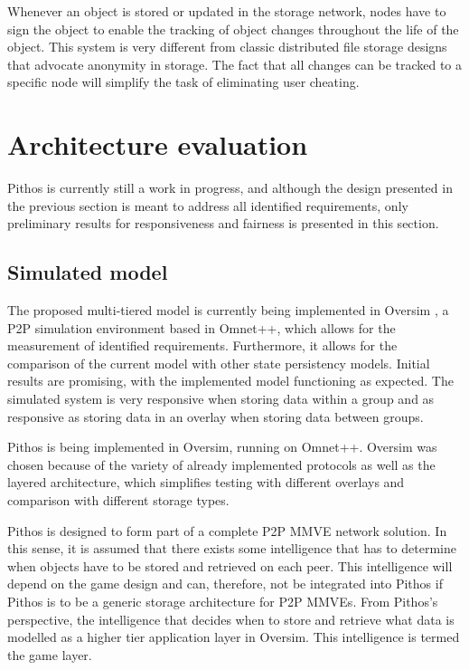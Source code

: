 \documentclass[10pt,a4paper,conference]{IEEEtran}
\begin{document}
Whenever an object is stored or updated in the storage network, nodes have to sign the object to enable the tracking of object changes throughout the
life of the object. This system is very different from classic distributed file storage designs that advocate anonymity in storage. The fact that all
changes can be tracked to a specific node will simplify the task of eliminating user cheating.

\section{Architecture evaluation}
\label{evaluation}

Pithos is currently still a work in progress, and although the design presented in the previous section is meant to address all identified
requirements, only preliminary results for responsiveness and fairness is presented in this section.

\subsection{Simulated model}
\label{test_setup}

The proposed multi-tiered model is currently being implemented in Oversim \cite{OverSim_2007}, a P2P simulation environment based in Omnet++, which
allows for the measurement of identified requirements. Furthermore, it allows for the comparison of the current model with other state persistency
models. Initial results are promising, with the implemented model functioning as expected. The simulated system is very responsive when storing data
within a group and as responsive as storing data in an overlay when storing data between groups.

Pithos is being implemented in Oversim, running on Omnet++. Oversim was chosen because of the variety of already implemented protocols as well as the
layered architecture, which simplifies testing with different overlays and comparison with different storage types.

Pithos is designed to form part of a complete P2P MMVE network solution. In this sense, it is assumed that there exists some intelligence that has to
determine when objects have to be stored and retrieved on each peer. This intelligence will depend on the game design and can, therefore, not be
integrated into Pithos if Pithos is to be a generic storage architecture for P2P MMVEs. From Pithos's perspective, the intelligence that decides when
to store and retrieve what data is modelled as a higher tier application layer in Oversim. This intelligence is termed the game layer.
\end{document}
